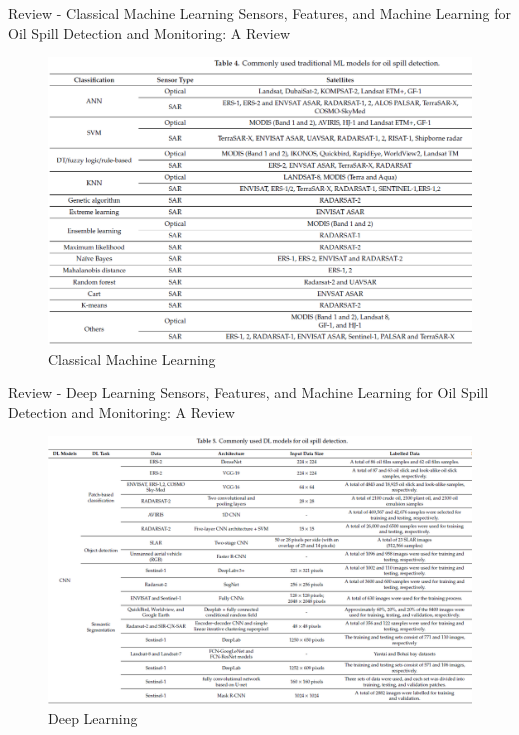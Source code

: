 \begin{frame}{Review  - Classical Machine Learning}
    Sensors, Features, and Machine Learning for Oil Spill Detection and Monitoring: A Review \cite{rs12203338}
    \begin{figure}
        \centering
        \includegraphics[scale=0.4]{img/section_02/oil_spill_detection_machine_learning.png}
        \caption{Classical Machine Learning}
        \label{fig:my_label}
    \end{figure}
\end{frame}

\begin{frame}{Review - Deep Learning}
    Sensors, Features, and Machine Learning for Oil Spill Detection and Monitoring: A Review \cite{rs12203338}
    \begin{figure}
        \centering
        \includegraphics[scale=0.4]{img/section_02/oil_spill_detection_deep_learning.png}
        \caption{Deep Learning \cite{rs12203338}}
        \label{fig:my_label}
    \end{figure}
\end{frame}

